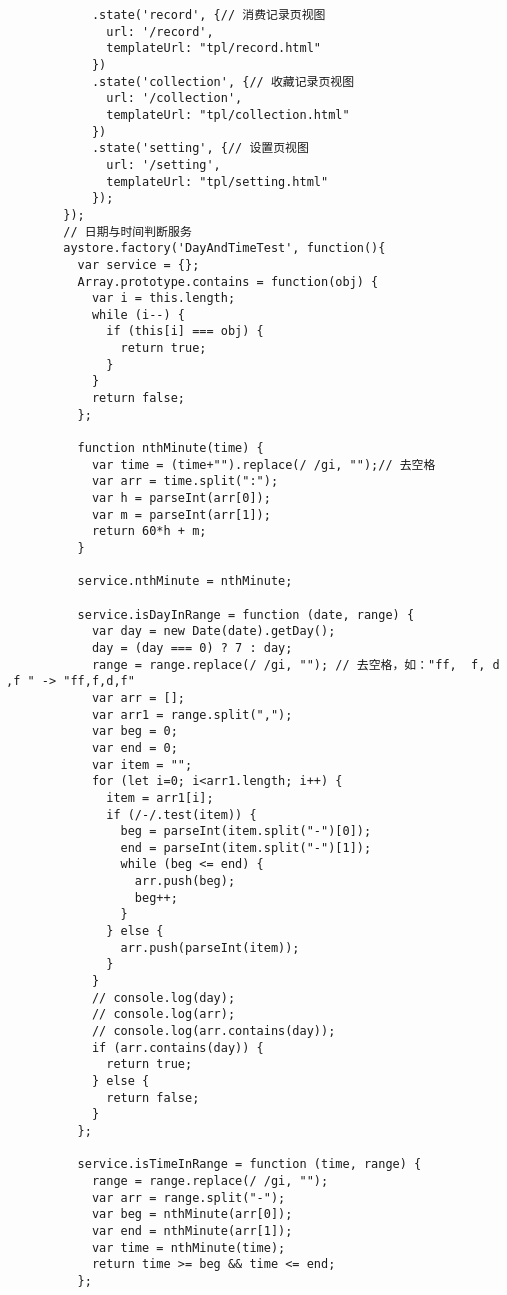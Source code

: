 \begin{lstlisting}
            .state('record', {// 消费记录页视图
              url: '/record',
              templateUrl: "tpl/record.html"
            })
            .state('collection', {// 收藏记录页视图
              url: '/collection',
              templateUrl: "tpl/collection.html"
            })
            .state('setting', {// 设置页视图
              url: '/setting',
              templateUrl: "tpl/setting.html"
            });
        });
        // 日期与时间判断服务
        aystore.factory('DayAndTimeTest', function(){
          var service = {};
          Array.prototype.contains = function(obj) {
            var i = this.length;
            while (i--) {
              if (this[i] === obj) {
                return true;
              }
            }
            return false;
          };

          function nthMinute(time) {
            var time = (time+"").replace(/ /gi, "");// 去空格
            var arr = time.split(":");
            var h = parseInt(arr[0]);
            var m = parseInt(arr[1]);
            return 60*h + m;
          }

          service.nthMinute = nthMinute;

          service.isDayInRange = function (date, range) {
            var day = new Date(date).getDay();
            day = (day === 0) ? 7 : day;
            range = range.replace(/ /gi, ""); // 去空格，如："ff,  f, d ,f " -> "ff,f,d,f"
            var arr = [];
            var arr1 = range.split(",");
            var beg = 0;
            var end = 0;
            var item = "";
            for (let i=0; i<arr1.length; i++) {
              item = arr1[i];
              if (/-/.test(item)) {
                beg = parseInt(item.split("-")[0]);
                end = parseInt(item.split("-")[1]);
                while (beg <= end) {
                  arr.push(beg);
                  beg++;
                }
              } else {
                arr.push(parseInt(item));
              }
            }
            // console.log(day);
            // console.log(arr);
            // console.log(arr.contains(day));
            if (arr.contains(day)) {
              return true;
            } else {
              return false;
            }
          };

          service.isTimeInRange = function (time, range) {
            range = range.replace(/ /gi, "");
            var arr = range.split("-");
            var beg = nthMinute(arr[0]);
            var end = nthMinute(arr[1]);
            var time = nthMinute(time);
            return time >= beg && time <= end;
          };


\end{lstlisting}
